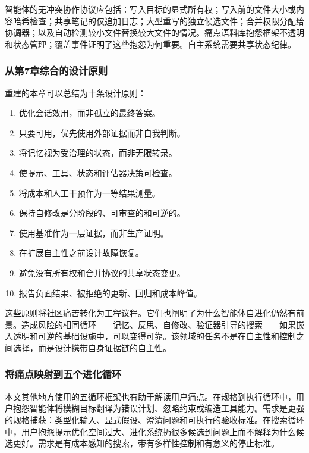 智能体的无冲突协作协议应包括：写入目标的显式所有权；写入前的文件大小或内容哈希检查；共享笔记的仅追加日志；大型重写的独立候选文件；合并权限分配给协调器；以及自动检测较小文件替换较大文件的情况。痛点语料库抱怨框架不透明和状态管理；覆盖事件证明了这些抱怨为何重要。自主系统需要共享状态纪律。

\subsubsection{从第7章综合的设计原则}
\label{sec:ch7-design-principles}

重建的本章可以总结为十条设计原则：

\begin{enumerate}[nosep]
\item 优化会话效用，而非孤立的最终答案。
\item 只要可用，优先使用外部证据而非自我判断。
\item 将记忆视为受治理的状态，而非无限转录。
\item 使提示、工具、状态和评估器决策可检查。
\item 将成本和人工干预作为一等结果测量。
\item 保持自修改是分阶段的、可审查的和可逆的。
\item 使用基准作为一层证据，而非生产证明。
\item 在扩展自主性之前设计故障恢复。
\item 避免没有所有权和合并协议的共享状态变更。
\item 报告负面结果、被拒绝的更新、回归和成本峰值。
\end{enumerate}

这些原则将社区痛苦转化为工程议程。它们也阐明了为什么智能体自进化仍然有前景。造成风险的相同循环——记忆、反思、自修改、验证器引导的搜索——如果嵌入透明和可逆的基础设施中，可以变得可靠。该领域的任务不是在自主性和控制之间选择，而是设计携带自身证据链的自主性。

\subsubsection{将痛点映射到五个进化循环}
\label{sec:ch7-painpoints-to-loops}

本文其他地方使用的五循环框架也有助于解读用户痛点。在规格到执行循环中，用户抱怨智能体将模糊目标翻译为错误计划、忽略约束或编造工具能力。需求是更强的规格捕获：类型化输入、显式假设、澄清问题和可执行的验收标准。在搜索循环中，用户抱怨提示优化空间过大、进化系统扔很多候选到问题上而不解释为什么候选更好。需求是有成本感知的搜索，带有多样性控制和有意义的停止标准。

